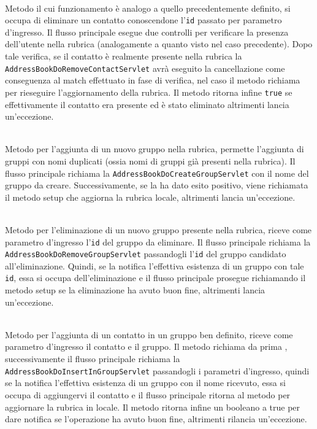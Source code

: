 \begin{description}
	\item{}\\
Metodo il cui funzionamento è analogo a quello precedentemente definito, si occupa di eliminare un contatto conoscendone l'\texttt{id} passato per parametro d'ingresso. Il flusso principale esegue due controlli per verificare la presenza dell'utente nella rubrica (analogamente a quanto visto nel caso precedente). 
Dopo tale verifica, se il contatto è realmente presente nella rubrica la  \texttt{AddressBookDoRemoveContactServlet} avrà eseguito la cancellazione come conseguenza al match effettuato in fase di verifica, nel caso il metodo richiama  per rieseguire l'aggiornamento della rubrica. Il metodo ritorna infine \texttt{true} se effettivamente il contatto era presente ed è stato eliminato altrimenti lancia un'eccezione.

	\item{}\\
	Metodo per l'aggiunta di un nuovo gruppo nella rubrica, permette l'aggiunta di gruppi con nomi duplicati (ossia nomi di gruppi già presenti nella rubrica). Il flusso principale richiama la  \texttt{AddressBookDoCreateGroupServlet} con il nome del gruppo da creare. Successivamente, se la  ha dato  esito positivo, viene richiamata il metodo setup che aggiorna la rubrica locale, altrimenti lancia un'eccezione.
	
	\item{}\\
	Metodo per l'eliminazione di un nuovo gruppo presente nella rubrica, riceve come parametro d'ingresso l'\texttt{id} del gruppo da eliminare. Il flusso principale richiama la  \texttt{AddressBookDoRemoveGroupServlet} passandogli l'\texttt{id} del gruppo candidato all'eliminazione. Quindi, se la  notifica l'effettiva esistenza di un gruppo con tale \texttt{id}, essa si occupa dell'eliminazione e il flusso principale prosegue richiamando il metodo setup se la eliminazione ha avuto buon fine, altrimenti lancia un'eccezione.
	
	\item{}\\
	Metodo per l'aggiunta di un contatto in un gruppo ben definito, riceve come parametro d'ingresso il contatto e il gruppo.
Il metodo richiama da prima , successivamente il flusso principale richiama la  \texttt{AddressBookDoInsertInGroupServlet} passandogli i parametri d'ingresso, quindi se la  notifica l'effettiva esistenza di un gruppo con il nome ricevuto, essa si occupa di aggiungervi il contatto e il flusso principale ritorna al metodo  per aggiornare la rubrica in locale. Il metodo ritorna infine un  booleano a true per dare notifica se l'operazione ha avuto buon fine, altrimenti rilancia un'eccezione.
	

\end{description}
